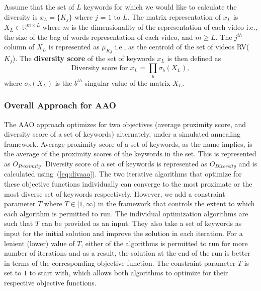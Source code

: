 Assume that the set of $L$ keywords for which we would like to calculate the diversity is $x_L = \{K_j\}$ where $j$ = $1$ to $L$. The matrix representation of $x_L$ is $X_L \in \mathbb{R} ^{m\times L} $ where $m$ is the dimensionality of the representation of each video i.e., the size of the bag of words representation of each video, and $m \ge L$. The $j^{th}$ column of $X_L$ is represented as $\mu_{Kj}$ i.e., as the centroid of the set of videos RV($K_j$). The \textbf{diversity score} of the set of keywords $x_L$ is then defined as 
\begin{equation} \label{eq:divaao}
\text{Diversity score for $x_L$}=\prod_{b}{\sigma_b(X_L) }, 
\end{equation}
 where $\sigma_b(X_L)$ is the $b^{th}$ singular value of the matrix $X_L$. 

\subsubsection{Overall Approach for AAO}
\label{sec:overallAAO}

The AAO approach optimizes for two objectives (average proximity score, and diversity score of a set of keywords) alternately, under a simulated annealing framework. Average proximity score of a set of keywords, as the name implies, is the average of the proximity scores of the keywords in the set. This is represented as $O_{Proximity}$. Diversity score of a set of keywords is represented as $O_{Diversity}$ and is calculated using~(\ref{eq:divaao}). The two iterative algorithms that optimize for these objective functions individually can converge to the most proximate or the most diverse set of keywords respectively. However, we add a constraint parameter $T$ where $T \in \lbrack 1, \infty)$ in the framework that controls the extent to which each algorithm is permitted to run. The individual optimization algorithms are such that $T$ can be provided as an input. They also take a set of keywords as input for the initial solution and improve the solution in each iteration. For a lenient (lower) value of $T$, either of the algorithms is permitted to run for more number of iterations and as a result, the solution at the end of the run is better in terms of the corresponding objective function. The constraint parameter $T$ is set to $1$ to start with, which allows both algorithms to optimize for their respective objective functions. 

